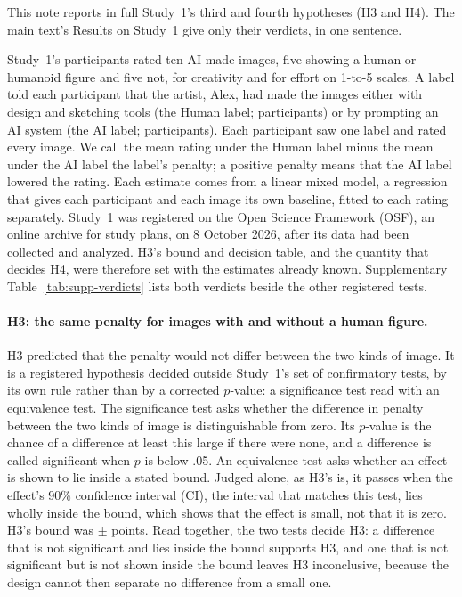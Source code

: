 
This note reports in full Study~1's third and fourth hypotheses (H3 and H4). The main text's Results on Study~1 give only their verdicts, in one sentence.

Study~1's \SOneN{} participants rated ten AI-made images, five showing a human or humanoid figure and five not, for creativity and for effort on 1-to-5 scales. A label told each participant that the artist, Alex, had made the images either with design and sketching tools (the Human label; \SOneNHuman{} participants) or by prompting an AI system (the AI label; \SOneNAI{} participants). Each participant saw one label and rated every image. We call the mean rating under the Human label minus the mean under the AI label the label's penalty; a positive penalty means that the AI label lowered the rating. Each estimate comes from a linear mixed model, a regression that gives each participant and each image its own baseline, fitted to each rating separately. Study~1 was registered on the Open Science Framework (OSF), an online archive for study plans, on 8 October 2026, after its data had been collected and analyzed. H3's bound and decision table, and the quantity that decides H4, were therefore set with the estimates already known. Supplementary Table~\ref{tab:supp-verdicts} lists both verdicts beside the other registered tests.

\paragraph*{H3: the same penalty for images with and without a human figure.}
H3 predicted that the penalty would not differ between the two kinds of image. It is a registered hypothesis decided outside Study~1's set of confirmatory tests, by its own rule rather than by a corrected $p$-value: a significance test read with an equivalence test. The significance test asks whether the difference in penalty between the two kinds of image is distinguishable from zero. Its $p$-value is the chance of a difference at least this large if there were none, and a difference is called significant when $p$ is below .05. An equivalence test asks whether an effect is shown to lie inside a stated bound. Judged alone, as H3's is, it passes when the effect's 90\% confidence interval (CI), the interval that matches this test, lies wholly inside the bound, which shows that the effect is small, not that it is zero.\cite{schuirmann1987comparison,lakens2017equivalence} H3's bound was $\pm$\SOneHThreeBound{} points. Read together, the two tests decide H3: a difference that is not significant and lies inside the bound supports H3, and one that is not significant but is not shown inside the bound leaves H3 inconclusive, because the design cannot then separate no difference from a small one.

